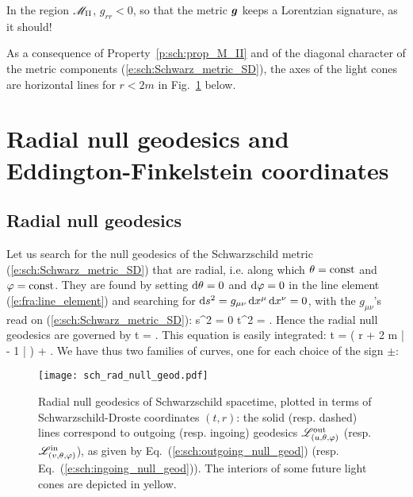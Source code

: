 \begin{remark}
In the region $\mathscr{M}_{\rm II}$, $g_{rr} < 0$, so that the
metric $\bm{g}$ keeps a Lorentzian signature, as it should!
\end{remark}

\begin{remark}
As a consequence of Property~\ref{p:sch:prop_M_II} and of the diagonal character of
the metric components (\ref{e:sch:Schwarz_metric_SD}),
the axes of the light cones are horizontal lines for $r<2m$ in Fig.~\ref{f:sch:rad_null_geod} below.
\end{remark}


\section{Radial null geodesics and Eddington-Finkelstein coordinates}
\label{s:sch:rad_geod_EF}

\subsection{Radial null geodesics}
\label{s:sch:rad_null_geod}

Let us search for the null geodesics of the Schwarzschild metric
(\ref{e:sch:Schwarz_metric_SD}) that are radial, i.e. along which
$\theta=\mathrm{const}$ and $\varphi=\mathrm{const}$. They are found by
setting  $\mathrm{d}\theta=0$ and $\mathrm{d}\varphi=0$ in the line element (\ref{e:fra:line_element})
and searching for $\mathrm{d} s^2 = g_{\mu\nu}\, \mathrm{d} x^\mu \, \mathrm{d} x^\nu = 0$,
with the $g_{\mu\nu}$'s read on (\ref{e:sch:Schwarz_metric_SD}):
\be \label{e:sch:radial_null}
    \D s^2 = 0 \iff \D t^2 =  .
\ee
Hence the radial null geodesics are governed by
\be \label{e:sch:Dt_Dr_radial_null_geod}
    \D t = \pm {} .
\ee
This equation is easily integrated:
\be \label{e:sch:t_r_radial_null_geod}
    t = \pm \left( r + 2 m \ln \left|  - 1 \right| \right) +  .
\ee
We have thus two families of curves, one for each choice
of the sign $\pm$:

\begin{figure}
\centerline{\texttt{[image: sch\_rad\_null\_geod.pdf]}}
\caption[]{\label{f:sch:rad_null_geod} \footnotesize
Radial null geodesics of Schwarzschild spacetime, plotted in terms
of Schwarzschild-Droste coordinates $(t,r)$: the solid (resp. dashed) lines
correspond to outgoing (resp. ingoing) geodesics $\mathscr{L}^{\rm out}_{(u,\theta,\varphi)}$
(resp. $\mathscr{L}^{\rm in}_{(v,\theta,\varphi)}$), as given by Eq.~(\ref{e:sch:outgoing_null_geod})
(resp. Eq.~(\ref{e:sch:ingoing_null_geod})). The interiors of some future light
cones are depicted in yellow.}
\end{figure}

